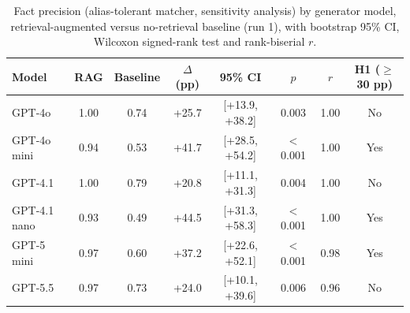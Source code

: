 \begin{table}[H]
\centering
\caption{Fact precision (alias-tolerant matcher, sensitivity analysis) by generator model, retrieval-augmented versus no-retrieval baseline (run 1), with bootstrap 95\% CI, Wilcoxon signed-rank test and rank-biserial $r$.}
\label{tab:multimodel-alias}
{\footnotesize{}\setlength{\tabcolsep}{4pt}
\begin{tabular}{lccccccc}
\toprule
\textbf{Model} & \textbf{RAG} & \textbf{Baseline} & \textbf{$\Delta$ (pp)} & \textbf{95\% CI} & \textbf{$p$} & \textbf{$r$} & \textbf{H1 ($\geq$30 pp)} \\
\midrule
GPT-4o & 1.00 & 0.74 & +25.7 & [+13.9, +38.2] & 0.003 & 1.00 & No \\
GPT-4o mini & 0.94 & 0.53 & +41.7 & [+28.5, +54.2] & $<$0.001 & 1.00 & Yes \\
GPT-4.1 & 1.00 & 0.79 & +20.8 & [+11.1, +31.3] & 0.004 & 1.00 & No \\
GPT-4.1 nano & 0.93 & 0.49 & +44.5 & [+31.3, +58.3] & $<$0.001 & 1.00 & Yes \\
GPT-5 mini & 0.97 & 0.60 & +37.2 & [+22.6, +52.1] & $<$0.001 & 0.98 & Yes \\
GPT-5.5 & 0.97 & 0.73 & +24.0 & [+10.1, +39.6] & 0.006 & 0.96 & No \\
\bottomrule
\end{tabular}
}
\end{table}
